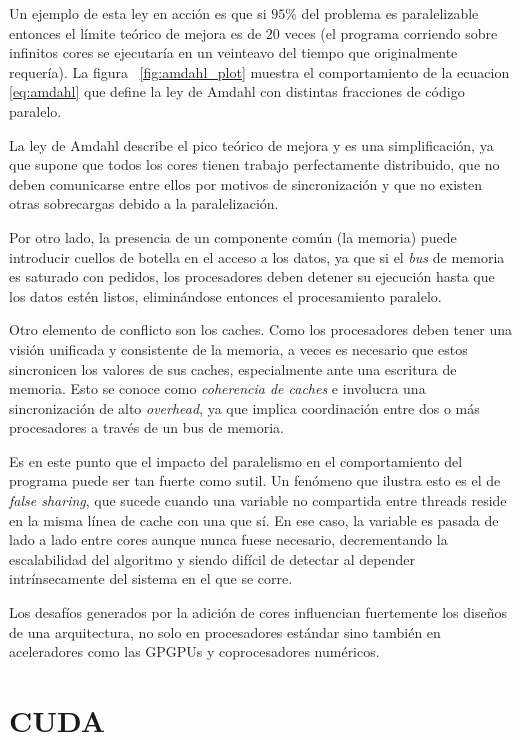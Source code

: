Un ejemplo de esta ley en acci\'on es que si $95 \%$ del problema es paralelizable entonces el l\'imite te\'orico de mejora es de $20$ veces (el programa corriendo sobre infinitos cores se ejecutar\'ia en un veinteavo del tiempo que originalmente requer\'ia).
La figura ~\ref{fig:amdahl_plot} muestra el comportamiento de la ecuacion \ref{eq:amdahl} que define la ley de Amdahl con distintas fracciones de c\'odigo paralelo.

La ley de Amdahl describe el pico te\'orico de mejora y es una simplificaci\'on, ya que supone que todos los cores tienen trabajo perfectamente distribuido, que no deben comunicarse entre ellos por motivos de sincronizaci\'on y que no existen otras sobrecargas debido a la paralelizaci\'on.

Por otro lado, la presencia de un componente com\'un (la memoria) puede introducir cuellos de botella en el acceso a los datos, ya que si el \textit{bus} de memoria es saturado con pedidos, los procesadores deben detener su ejecuci\'on hasta que los datos est\'en listos, elimin\'andose entonces el procesamiento paralelo.

Otro elemento de conflicto son los caches.
Como los procesadores deben tener una visi\'on unificada y consistente de la memoria, a veces es necesario que estos sincronicen los valores de sus caches, especialmente ante una escritura de memoria.
Esto se conoce como \textit{coherencia de caches} e involucra una sincronizaci\'on de alto \textit{overhead}, ya que implica coordinaci\'on entre dos o m\'as procesadores a trav\'es de un bus de memoria.

Es en este punto que el impacto del paralelismo en el comportamiento del programa puede ser tan fuerte como sutil.
Un fen\'omeno que ilustra esto es el de \textit{false sharing}, que sucede cuando una variable no compartida entre threads reside en la misma l\'inea de cache con una que s\'i. En ese caso, la variable es pasada de lado a lado entre cores aunque nunca fuese necesario, decrementando la escalabilidad del algoritmo y siendo dif\'icil de detectar al depender intr\'insecamente del sistema en el que se corre.

Los desaf\'ios generados por la adici\'on de cores influencian fuertemente los dise\~nos de una arquitectura, no solo en procesadores est\'andar sino tambi\'en en aceleradores como las GPGPUs y coprocesadores num\'ericos.

\section{CUDA}

